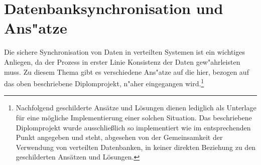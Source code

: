 \documentclass[a4paper,14pt]{scrreprt}
\begin{document}
\section{Datenbanksynchronisation und Ans"atze}
Die sichere Synchronisation von Daten in verteilten Systemen ist ein wichtiges Anliegen, da der Prozess in erster Linie Konsistenz der Daten gew"ahrleisten muss. Zu diesem Thema gibt es verschiedene Ans"atze auf die hier, bezogen auf das oben beschriebene Diplomprojekt, n"aher eingegangen wird.\footnote{Nachfolgend geschilderte Ansätze und Lösungen dienen lediglich als Unterlage für eine mögliche Implementierung einer solchen Situation. Das beschriebene Diplomprojekt wurde ausschließlich so implementiert wie im entsprechenden Punkt angegeben und steht, abgesehen von der Gemeinsamkeit der Verwendung von verteilten Datenbanken, in keiner direkten Beziehung zu den geschilderten Ansätzen und Lösungen.}
\end{document}
